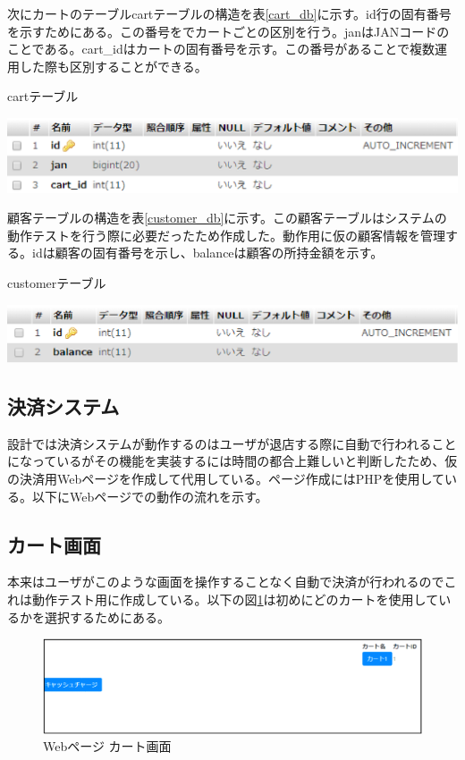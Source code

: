 \newpage

次にカートのテーブルcartテーブルの構造を表\ref{cart_db}に示す。id行の固有番号を示すためにある。この番号をでカートごとの区別を行う。janはJANコードのことである。cart\_idはカートの固有番号を示す。この番号があることで複数運用した際も区別することができる。
\begin{table}[htbp]
\centering
\caption{cartテーブル}
\includegraphics[width=15cm]{./pic/cart_db.eps}
\label{cart_db}
\end{table}


顧客テーブルの構造を表\ref{customer_db}に示す。この顧客テーブルはシステムの動作テストを行う際に必要だったため作成した。動作用に仮の顧客情報を管理する。idは顧客の固有番号を示し、balanceは顧客の所持金額を示す。

\begin{table}[htbp]
\centering
\caption{customerテーブル}
\includegraphics[width=15cm]{./pic/customer.eps}
\label{customer_db}
\end{table}

\newpage

\subsection*{決済システム}
設計では決済システムが動作するのはユーザが退店する際に自動で行われることになっているがその機能を実装するには時間の都合上難しいと判断したため、仮の決済用Webページを作成して代用している。ページ作成にはPHPを使用している。以下にWebページでの動作の流れを示す。

\subsection*{カート画面}
本来はユーザがこのような画面を操作することなく自動で決済が行われるのでこれは動作テスト用に作成している。以下の図\ref{web_cart}は初めにどのカートを使用しているかを選択するためにある。
\begin{figure}[htbp]
\centering
\includegraphics[width=15cm]{./pic/web/1.eps}
\caption{Webページ カート画面}
\label{web_cart}
\end{figure}

